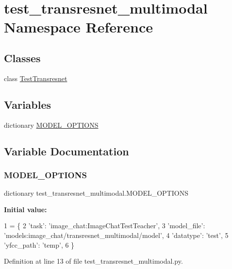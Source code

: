 \hypertarget{namespacetest__transresnet__multimodal}{}\section{test\+\_\+transresnet\+\_\+multimodal Namespace Reference}
\label{namespacetest__transresnet__multimodal}
\subsection*{Classes}
\begin{DoxyCompactItemize}
\item 
class \hyperlink{classtest__transresnet__multimodal_1_1TestTransresnet}{Test\+Transresnet}
\end{DoxyCompactItemize}
\subsection*{Variables}
\begin{DoxyCompactItemize}
\item 
dictionary \hyperlink{namespacetest__transresnet__multimodal_a8a8ef21de7a63200761fa10222cc1f66}{M\+O\+D\+E\+L\+\_\+\+O\+P\+T\+I\+O\+NS}
\end{DoxyCompactItemize}


\subsection{Variable Documentation}
\mbox{\label{namespacetest__transresnet__multimodal_a8a8ef21de7a63200761fa10222cc1f66}} 
\subsubsection{\texorpdfstring{M\+O\+D\+E\+L\+\_\+\+O\+P\+T\+I\+O\+NS}{MODEL\_OPTIONS}}
{\footnotesize\ttfamily dictionary test\+\_\+transresnet\+\_\+multimodal.\+M\+O\+D\+E\+L\+\_\+\+O\+P\+T\+I\+O\+NS}

{\bfseries Initial value\+:}
\begin{DoxyCode}
1 =  \{
2     \textcolor{stringliteral}{'task'}: \textcolor{stringliteral}{'image\_chat:ImageChatTestTeacher'},
3     \textcolor{stringliteral}{'model\_file'}: \textcolor{stringliteral}{'models:image\_chat/transresnet\_multimodal/model'},
4     \textcolor{stringliteral}{'datatype'}: \textcolor{stringliteral}{'test'},
5     \textcolor{stringliteral}{'yfcc\_path'}: \textcolor{stringliteral}{'temp'},
6 \}
\end{DoxyCode}


Definition at line 13 of file test\+\_\+transresnet\+\_\+multimodal.\+py.

